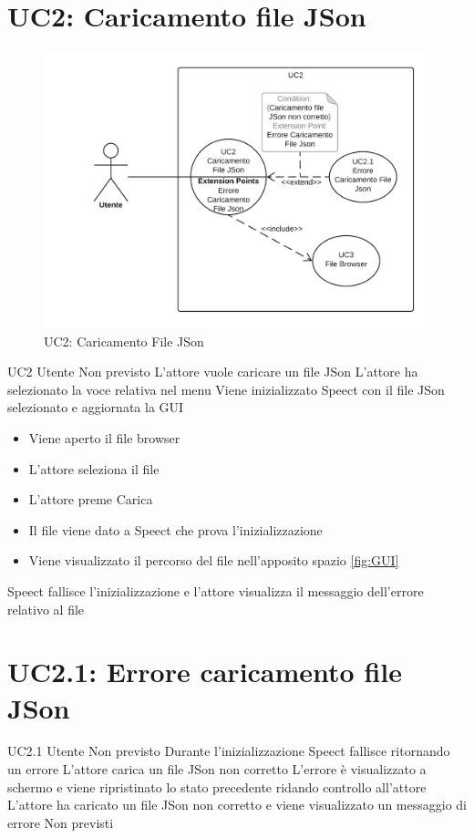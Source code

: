 \documentclass[../AnalisideiRequisiti.tex]{subfiles}
\begin{document}
	\section{UC2: Caricamento file JSon}
	\begin{figure}[H]
		\centering
		\includegraphics[width=\textwidth]{../img/UC2.png}
		\caption{UC2: Caricamento File JSon}
	\end{figure}
	\UserCase
	{UC2}
	{Utente}
	{Non previsto}
	{L'attore vuole caricare un file JSon}
	{L'attore ha selezionato la voce relativa nel menu }
	{Viene inizializzato Speect con il file JSon selezionato e aggiornata la GUI}
	{
		\begin{itemize}
			\item{} Viene aperto il file browser 
			\item{} L'attore seleziona il file 
			\item{} L'attore preme Carica
			\item{} Il file viene dato a Speect che prova l'inizializzazione
			\item{} Viene visualizzato il percorso del file nell'apposito spazio \ref{fig:GUI}
		\end{itemize}
	}
	{Speect fallisce l'inizializzazione e l'attore visualizza il messaggio dell'errore relativo al file }
	
	\section{UC2.1: Errore caricamento file JSon}
	\UserCase
	{UC2.1}
	{Utente}
	{Non previsto}
	{Durante l'inizializzazione Speect fallisce ritornando un errore}
	{L'attore carica un file JSon non corretto}
	{L'errore è visualizzato a schermo e viene ripristinato lo stato precedente ridando controllo all'attore}
	{L'attore ha caricato un file JSon non corretto e viene visualizzato un messaggio di errore}
	{Non previsti}
\end{document}
